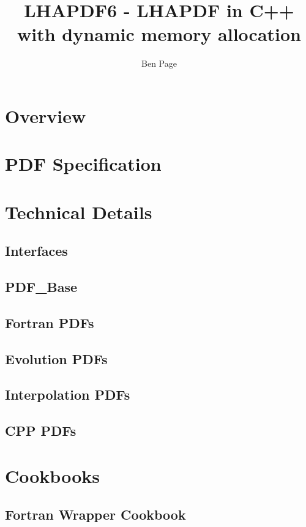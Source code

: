 \documentclass{report}
\begin{document}
\title { LHAPDF6 - LHAPDF in C++ with dynamic memory allocation }
\author{ Ben Page }

\maketitle

\chapter{Overview}
  

\chapter{PDF Specification}

\chapter{Technical Details}

  \section{Interfaces}
    

  \section{PDF\_Base}
    

  \section{Fortran PDFs}
    

  \section{Evolution PDFs}
    

  \section{Interpolation PDFs}
    
    
  \section{CPP PDFs}
    

\chapter{Cookbooks}

  \section{Fortran Wrapper Cookbook}
  
\end{document}
